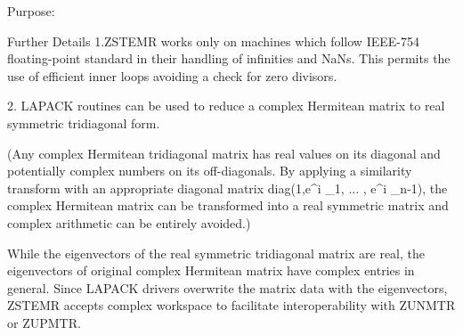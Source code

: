 \begin{DoxyParagraph}{Purpose\+: }
\begin{DoxyVerb}
 Further Details
 1.ZSTEMR works only on machines which follow IEEE-754
 floating-point standard in their handling of infinities and NaNs.
 This permits the use of efficient inner loops avoiding a check for
 zero divisors.

 2. LAPACK routines can be used to reduce a complex Hermitean matrix to
 real symmetric tridiagonal form.

 (Any complex Hermitean tridiagonal matrix has real values on its diagonal
 and potentially complex numbers on its off-diagonals. By applying a
 similarity transform with an appropriate diagonal matrix
 diag(1,e^{i \phy_1}, ... , e^{i \phy_{n-1}}), the complex Hermitean
 matrix can be transformed into a real symmetric matrix and complex
 arithmetic can be entirely avoided.)

 While the eigenvectors of the real symmetric tridiagonal matrix are real,
 the eigenvectors of original complex Hermitean matrix have complex entries
 in general.
 Since LAPACK drivers overwrite the matrix data with the eigenvectors,
 ZSTEMR accepts complex workspace to facilitate interoperability
 with ZUNMTR or ZUPMTR.\end{DoxyVerb}
 
\end{DoxyParagraph}


